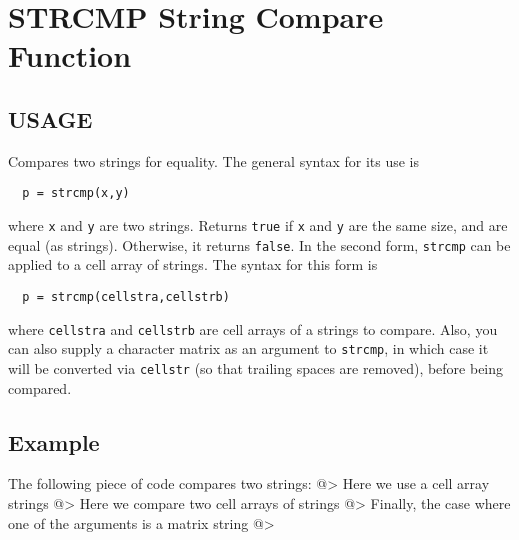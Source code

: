 \section{STRCMP String Compare Function}

\subsection{USAGE}

Compares two strings for equality.  The general
syntax for its use is
\begin{verbatim}
  p = strcmp(x,y)
\end{verbatim}
where \verb|x| and \verb|y| are two strings.  Returns \verb|true| if \verb|x|
and \verb|y| are the same size, and are equal (as strings).  Otherwise,
it returns \verb|false|.
In the second form, \verb|strcmp| can be applied to a cell array of
strings.  The syntax for this form is
\begin{verbatim}
  p = strcmp(cellstra,cellstrb)
\end{verbatim}
where \verb|cellstra| and \verb|cellstrb| are cell arrays of a strings
to compare.  Also, you can also supply a character matrix as
an argument to \verb|strcmp|, in which case it will be converted
via \verb|cellstr| (so that trailing spaces are removed), before being
compared.
\subsection{Example}

The following piece of code compares two strings:
@>
Here we use a cell array strings
@>
Here we compare two cell arrays of strings
@>
Finally, the case where one of the arguments is a matrix
string
@>
